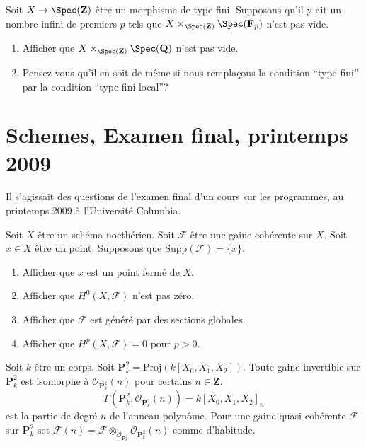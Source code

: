 \begin{exercise}
\label{exercise-finite-type-over-Z}
Soit $X \to \Spec({\mathbf Z})$ être un morphisme de type
fini. Supposons qu'il y ait un nombre infini de premiers
$p$ tels que $X \times_{\Spec({\mathbf Z})} \Spec({\mathbf F}_p)$ n'est pas vide.
\begin{enumerate}
\item Afficher que $X \times_{\Spec({\mathbf Z})}\Spec(\mathbf{Q})$ n'est
pas vide.
\item Pensez-vous qu'il en soit de même si nous remplaçons
la condition ``type fini'' par la condition ``type fini local''?
\end{enumerate}
\end{exercise}




\section{Schemes, Examen final, printemps 2009}
\label{section-final-exam-spring-2009}

\noindent
Il s'agissait des questions de l'examen final d'un cours sur les
programmes, au printemps 2009 à l'Université Columbia.

\begin{exercise}
\label{exercise-Noetherian-coherent}
Soit $X$ être un schéma noethérien.
Soit $\mathcal{F}$ être une gaine cohérente sur $X$.
Soit $x \in X$ être
un point. Supposons que $\text{Supp}(\mathcal{F}) = \{ x \}$.
\begin{enumerate}
\item Afficher que $x$ est un point fermé de $X$.
\item Afficher que $H^0(X, \mathcal{F})$ n'est pas zéro.
\item Afficher que $\mathcal{F}$ est généré par des sections globales.
\item Afficher que $H^p(X, \mathcal{F}) = 0$ pour $p > 0$.
\end{enumerate}
\end{exercise}

\begin{remark}
\label{remark-invertible-projective-space}
Soit $k$
être un corps. Soit $\mathbf{P}^2_k = \text{Proj}(k[X_0,
X_1, X_2])$. Toute gaine invertible sur $\mathbf{P}^2_k$
est isomorphe à $\mathcal{O}_{\mathbf{P}^2_k}(n)$ pour certains $n \in
\mathbf{Z}$.
$$
\Gamma(\mathbf{P}^2_k, \mathcal{O}_{\mathbf{P}^2_k}(n)) =
k[X_0, X_1, X_2]_n
$$
est la partie de degré
$n$ de l'anneau polynôme. Pour une gaine
quasi-cohérente $\mathcal{F}$
sur
$\mathbf{P}^2_k$ set $\mathcal{F}(n) =
\mathcal{F} \otimes_{\mathcal{O}_{\mathbf{P}^2_k}} \mathcal{O}_{\mathbf{P}^2_k}(n)$ comme
d'habitude.
\end{remark}

